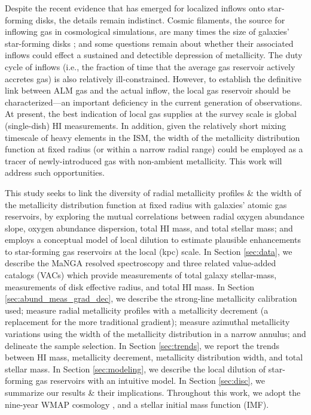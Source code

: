 Despite the recent evidence that has emerged for localized inflows onto star-forming disks, the details remain indistinct. Cosmic filaments, the source for inflowing gas in cosmological simulations, are many times the size of galaxies' star-forming disks \citep{martin_inflows}; and some questions remain about whether their associated inflows could effect a sustained and detectible depression of metallicity. The duty cycle of inflows (i.e., the fraction of time that the average gas reservoir actively accretes gas) is also relatively ill-constrained. However, to establish the definitive link between ALM gas and the actual inflow, the local gas reservoir should be characterized---an important deficiency in the current generation of observations. At present, the best indication of local gas supplies at the survey scale is global (single-dish) HI measurements. In addition, given the relatively short mixing timescale of heavy elements in the ISM, the width of the metallicity distribution function at fixed radius (or within a narrow radial range) could be employed as a tracer of newly-introduced gas with non-ambient metallicity. This work will address such opportunities.

This study seeks to link the diversity of radial metallicity profiles \& the width of the metallicity distribution function at fixed radius with galaxies' atomic gas reservoirs, by exploring the mutual correlations between radial oxygen abundance slope, oxygen abundance dispersion, total HI mass, and total stellar mass; and employs a conceptual model of local dilution to estimate plausible enhancements to star-forming gas reservoirs at the local (kpc) scale. In Section \ref{sec:data}, we describe the MaNGA resolved spectroscopy and three related value-added catalogs (VACs) which provide measurements of total galaxy stellar-mass, measurements of disk effective radius, and total HI mass. In Section \ref{sec:abund_meas_grad_dec}, we describe the strong-line metallicity calibration used; measure radial metallicity profiles with a metallicity decrement (a replacement for the more traditional gradient); measure azimuthal metallicity variations using the width of the metallicity distribution in a narrow annulus; and delineate the sample selection. In Section \ref{sec:trends}, we report the trends between HI mass, metallicity decrement, metallicity distribution width, and total stellar mass. In Section \ref{sec:modeling}, we describe the local dilution of star-forming gas reservoirs with an intuitive model. In Section \ref{sec:disc}, we summarize our results \& their implications. Throughout this work, we adopt the nine-year WMAP cosmology \citep{wmap9}, and a \citet{kroupa_imf_01} stellar initial mass function (IMF).